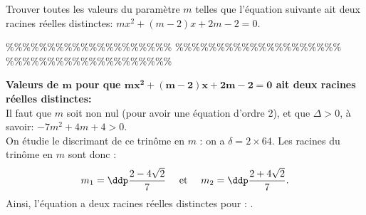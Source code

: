 



\begin{exercice} 
Trouver toutes les valeurs du param\`{e}tre $m$ telles que l'\'equation suivante ait deux racines r\'eelles distinctes: $mx^2+(m-2)x+2m-2=0$.
\end{exercice}


\%\%\%\%\%\%\%\%\%\%\%\%\%\%\%\%\%\%\%\%
\%\%\%\%\%\%\%\%\%\%\%\%\%\%\%\%\%\%\%\%
\%\%\%\%\%\%\%\%\%\%\%\%\%\%\%\%\%\%\%\%




\begin{correction}  \; \textbf{Valeurs de $\mathbf{m}$ pour que $\mathbf{mx^2+(m-2)x+2m-2=0}$ ait deux racines r\'eelles distinctes:}\\
\noindent Il faut que $m$ soit non nul (pour avoir une \'equation d'ordre 2), et que $\Delta>0$, \`{a} savoir: $-7m^2+4m+4>0$. \\
On \'etudie le discrimant de ce trin\^ome en $m$ : on a $\delta = 2\times 64$. Les racines du trin\^ome en $m$ sont donc :
$$m_1=\ddp\frac{2-4\sqrt{2}}{7} \quad \textmd{ et } \quad m_2=\ddp\frac{2+4\sqrt{2}}{7}.$$ 
Ainsi, l'\'equation a deux racines r\'eelles distinctes pour : .
\end{correction}